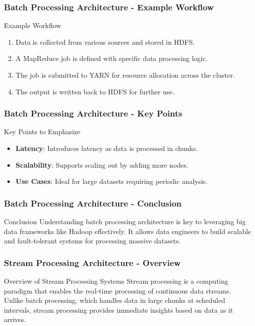 \documentclass[aspectratio=169]{beamer}
\begin{document}
\begin{frame}[fragile]
    \frametitle{Batch Processing Architecture - Example Workflow}
    \begin{block}{Example Workflow}
        \begin{enumerate}
            \item Data is collected from various sources and stored in HDFS.
            \item A MapReduce job is defined with specific data processing logic.
            \item The job is submitted to YARN for resource allocation across the cluster.
            \item The output is written back to HDFS for further use.
        \end{enumerate}
    \end{block}
\end{frame}

\begin{frame}[fragile]
    \frametitle{Batch Processing Architecture - Key Points}
    \begin{block}{Key Points to Emphasize}
        \begin{itemize}
            \item \textbf{Latency}: Introduces latency as data is processed in chunks.
            \item \textbf{Scalability}: Supports scaling out by adding more nodes.
            \item \textbf{Use Cases}: Ideal for large datasets requiring periodic analysis.
        \end{itemize}
    \end{block}
\end{frame}

\begin{frame}[fragile]
    \frametitle{Batch Processing Architecture - Conclusion}
    \begin{block}{Conclusion}
        Understanding batch processing architecture is key to leveraging big data frameworks like Hadoop effectively. It allows data engineers to build scalable and fault-tolerant systems for processing massive datasets.
    \end{block}
\end{frame}

\begin{frame}[fragile]
    \frametitle{Stream Processing Architecture - Overview}
    \begin{block}{Overview of Stream Processing Systems}
        Stream processing is a computing paradigm that enables the real-time processing of continuous data streams. Unlike batch processing, which handles data in large chunks at scheduled intervals, stream processing provides immediate insights based on data as it arrives.
    \end{block}
\end{frame}
\end{document}
